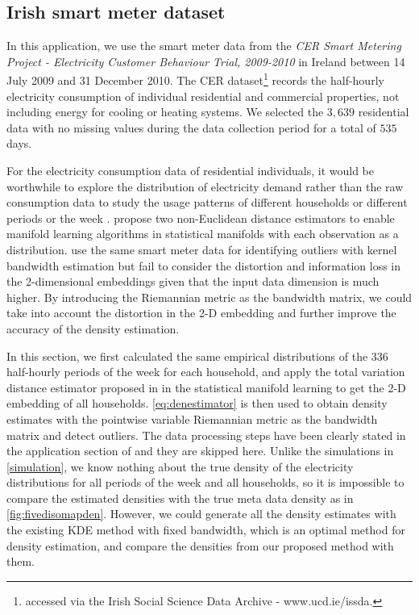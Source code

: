 \documentclass[11pt,a4paper,]{article}
\begin{document}
\hypertarget{irish-smart-meter-dataset}{%
\subsection{Irish smart meter dataset}\label{irish-smart-meter-dataset}}

In this application, we use the smart meter data from the \emph{CER Smart Metering Project - Electricity Customer Behaviour Trial, 2009-2010} in Ireland \autocite{cer2012-data} between 14 July 2009 and 31 December 2010. The CER dataset\footnote{accessed via the Irish Social Science Data Archive - www.ucd.ie/issda.} records the half-hourly electricity consumption of individual residential and commercial properties, not including energy for cooling or heating systems. We selected the \(3,639\) residential data with no missing values during the data collection period for a total of
\(535\) days.

For the electricity consumption data of residential individuals, it would be worthwhile to explore the distribution of electricity demand rather than the raw consumption data to study the usage patterns of different households or different periods or the week \autocite{Hyndman2018-ia}.
\textcite{Cheng2021-ex} propose two non-Euclidean distance estimators to enable manifold learning algorithms in statistical manifolds with each observation as a distribution. \textcite{Cheng2021-ex} use the same smart meter data for identifying outliers with kernel bandwidth estimation but fail to consider the distortion and information loss in the 2-dimensional embeddings given that the input data dimension is much higher. By introducing the Riemannian metric as the bandwidth matrix, we could take into account the distortion in the 2-D embedding and further improve the accuracy of the density estimation.

In this section, we first calculated the same empirical distributions of the \(336\) half-hourly periods of the week for each household, and apply the total variation distance estimator proposed in \textcite{Cheng2021-ex} in the statistical manifold learning to get the 2-D embedding of all households. \autoref{eq:denestimator} is then used to obtain density estimates with the pointwise variable Riemannian metric as the bandwidth matrix and detect outliers. The data processing steps have been clearly
stated in the application section of \textcite{Cheng2021-ex} and they are skipped here. Unlike the simulations in \autoref{simulation}, we know nothing about the true density of the electricity distributions for all periods of the week and all households, so it is impossible to compare the estimated densities with the true meta data density as in \autoref{fig:fivedisomapden}. However, we could generate all the density estimates with the existing KDE method with fixed bandwidth, which is an optimal method for density estimation, and compare the densities from our proposed method with them.
\end{document}
